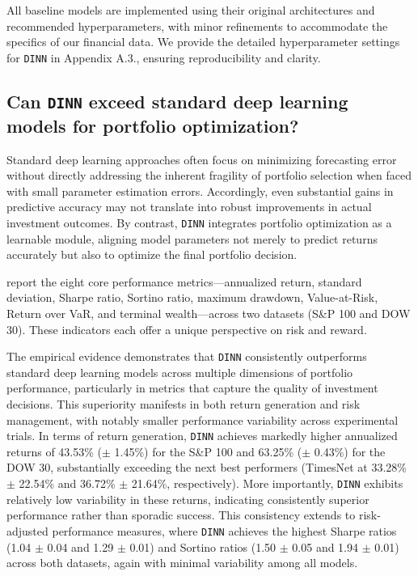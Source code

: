 All baseline models are implemented using their original architectures and recommended hyperparameters, with minor refinements to accommodate the specifics of our financial data. We provide the detailed hyperparameter settings for \texttt{DINN} in Appendix A.3., ensuring reproducibility and clarity.

\subsection{Can \texttt{DINN} exceed standard deep learning models for portfolio optimization?}
Standard deep learning approaches often focus on minimizing forecasting error without directly addressing the inherent fragility of portfolio selection when faced with small parameter estimation errors. Accordingly, even substantial gains in predictive accuracy may not translate into robust improvements in actual investment outcomes. By contrast, \texttt{DINN} integrates portfolio optimization as a learnable module, aligning model parameters not merely to predict returns accurately but also to optimize the final portfolio decision.

 report the eight core performance metrics—annualized return, standard deviation, Sharpe ratio, Sortino ratio, maximum drawdown, Value-at-Risk, Return over VaR, and terminal wealth—across two datasets (S\&P 100 and DOW 30). These indicators each offer a unique perspective on risk and reward.

The empirical evidence demonstrates that \texttt{DINN} consistently outperforms standard deep learning models across multiple dimensions of portfolio performance, particularly in metrics that capture the quality of investment decisions. This superiority manifests in both return generation and risk management, with notably smaller performance variability across experimental trials. In terms of return generation, \texttt{DINN} achieves markedly higher annualized returns of 43.53\% ($\pm$ 1.45\%) for the S\&P 100 and 63.25\% ($\pm$ 0.43\%) for the DOW 30, substantially exceeding the next best performers (TimesNet at 33.28\% $\pm$ 22.54\% and 36.72\% $\pm$ 21.64\%, respectively). More importantly, \texttt{DINN} exhibits relatively low variability in these returns, indicating consistently superior performance rather than sporadic success. This consistency extends to risk-adjusted performance measures, where \texttt{DINN} achieves the highest Sharpe ratios (1.04 $\pm$ 0.04 and 1.29 $\pm$ 0.01) and Sortino ratios (1.50 $\pm$ 0.05 and 1.94 $\pm$ 0.01) across both datasets, again with minimal variability among all models.

